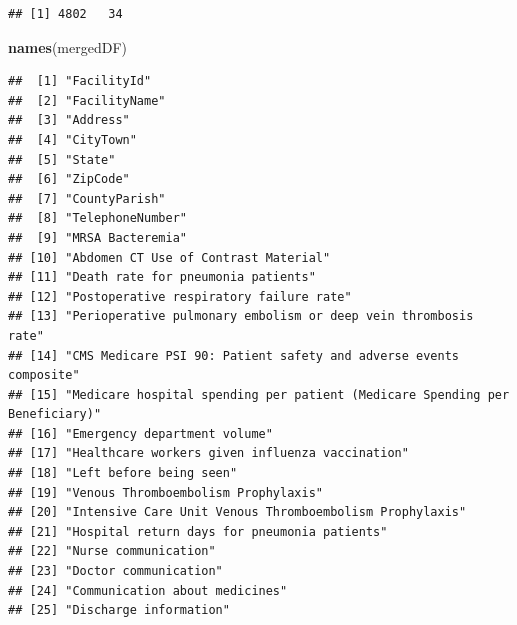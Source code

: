 \documentclass[
]{article}
\newenvironment{Shaded}{\begin{snugshade}}{\end{snugshade}}
\newcommand{\FunctionTok}[1]{\textcolor[rgb]{0.13,0.29,0.53}{\textbf{#1}}}
\newcommand{\NormalTok}[1]{#1}
\begin{document}
\begin{verbatim}
## [1] 4802   34
\end{verbatim}

\begin{Shaded}
\begin{Highlighting}[]
\FunctionTok{names}\NormalTok{(mergedDF)}
\end{Highlighting}
\end{Shaded}

\begin{verbatim}
##  [1] "FacilityId"                                                                
##  [2] "FacilityName"                                                              
##  [3] "Address"                                                                   
##  [4] "CityTown"                                                                  
##  [5] "State"                                                                     
##  [6] "ZipCode"                                                                   
##  [7] "CountyParish"                                                              
##  [8] "TelephoneNumber"                                                           
##  [9] "MRSA Bacteremia"                                                           
## [10] "Abdomen CT Use of Contrast Material"                                       
## [11] "Death rate for pneumonia patients"                                         
## [12] "Postoperative respiratory failure rate"                                    
## [13] "Perioperative pulmonary embolism or deep vein thrombosis rate"             
## [14] "CMS Medicare PSI 90: Patient safety and adverse events composite"          
## [15] "Medicare hospital spending per patient (Medicare Spending per Beneficiary)"
## [16] "Emergency department volume"                                               
## [17] "Healthcare workers given influenza vaccination"                            
## [18] "Left before being seen"                                                    
## [19] "Venous Thromboembolism Prophylaxis"                                        
## [20] "Intensive Care Unit Venous Thromboembolism Prophylaxis"                    
## [21] "Hospital return days for pneumonia patients"                               
## [22] "Nurse communication"                                                       
## [23] "Doctor communication"                                                      
## [24] "Communication about medicines"                                             
## [25] "Discharge information"                                                     

\end{verbatim}
\end{document}
